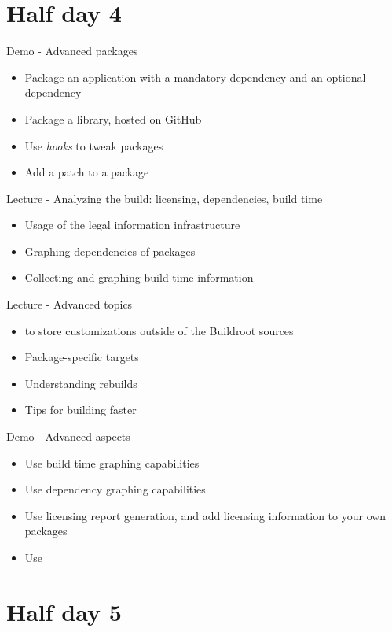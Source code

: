 \documentclass[a4paper,12pt,obeyspaces,spaces,hyphens]{article}
\begin{document}
\section{Half day 4}

\feagendaonecolumn
{Demo - Advanced packages}
{
  \begin{itemize}
  \item Package an application with a mandatory dependency and an
    optional dependency
  \item Package a library, hosted on GitHub
  \item Use {\em hooks} to tweak packages
  \item Add a patch to a package
  \end{itemize}
}

\feagendaonecolumn
{Lecture - Analyzing the build: licensing, dependencies, build time}
{
  \begin{itemize}
  \item Usage of the legal information infrastructure
  \item Graphing dependencies of packages
  \item Collecting and graphing build time information
  \end{itemize}
}

\feagendatwocolumn
{Lecture - Advanced topics}
{
  \begin{itemize}
  \item {} to store customizations outside of the
    Buildroot sources
  \item Package-specific targets
  \item Understanding rebuilds
  \item Tips for building faster
  \end{itemize}
}
{Demo - Advanced aspects}
{
  \begin{itemize}
  \item Use build time graphing capabilities
  \item Use dependency graphing capabilities
  \item Use licensing report generation, and add licensing
    information to your own packages
  \item Use 
  \end{itemize}
}

\newpage

\section{Half day 5}
\end{document}
